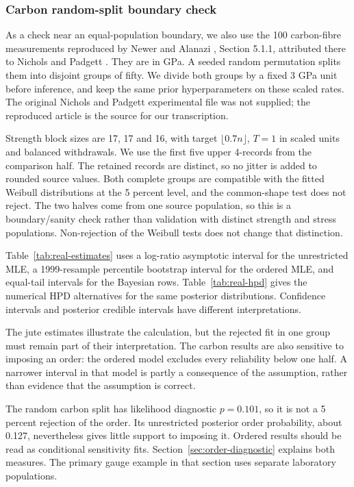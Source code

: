 \documentclass[a4paper,11pt]{article}
\begin{document}


\subsubsection{Carbon random-split boundary check}
As a check near an equal-population boundary, we also use the 100 carbon-fibre measurements reproduced by Newer and Alanazi \cite{NewerAlanazi2026}, Section 5.1.1, attributed there to Nichols and Padgett \cite{Nichols2006}. They are in GPa. A seeded random permutation splits them into disjoint groups of fifty. We divide both groups by a fixed 3 GPa unit before inference, and keep the same prior hyperparameters on these scaled rates. The original Nichols and Padgett experimental file was not supplied; the reproduced article is the source for our transcription.

Strength block sizes are 17, 17 and 16, with target $\lfloor0.7n\rfloor$, $T=1$ in scaled units and balanced withdrawals. We use the first five upper 4-records from the comparison half. The retained records are distinct, so no jitter is added to rounded source values. Both complete groups are compatible with the fitted Weibull distributions at the 5 percent level, and the common-shape test does not reject. The two halves come from one source population, so this is a boundary/sanity check rather than validation with distinct strength and stress populations. Non-rejection of the Weibull tests does not change that distinction.





Table~\ref{tab:real-estimates} uses a log-ratio asymptotic interval for the unrestricted MLE, a 1999-resample percentile bootstrap interval for the ordered MLE, and equal-tail intervals for the Bayesian rows. Table~\ref{tab:real-hpd} gives the numerical HPD alternatives for the same posterior distributions. Confidence intervals and posterior credible intervals have different interpretations.

The jute estimates illustrate the calculation, but the rejected fit in one group must remain part of their interpretation. The carbon results are also sensitive to imposing an order: the ordered model excludes every reliability below one half. A narrower interval in that model is partly a consequence of the assumption, rather than evidence that the assumption is correct.


The random carbon split has likelihood diagnostic $p=0.101$, so it is not a 5 percent rejection of the order. Its unrestricted posterior order probability, about 0.127, nevertheless gives little support to imposing it. Ordered results should be read as conditional sensitivity fits. Section~\ref{sec:order-diagnostic} explains both measures. The primary gauge example in that section uses separate laboratory populations.
\end{document}
